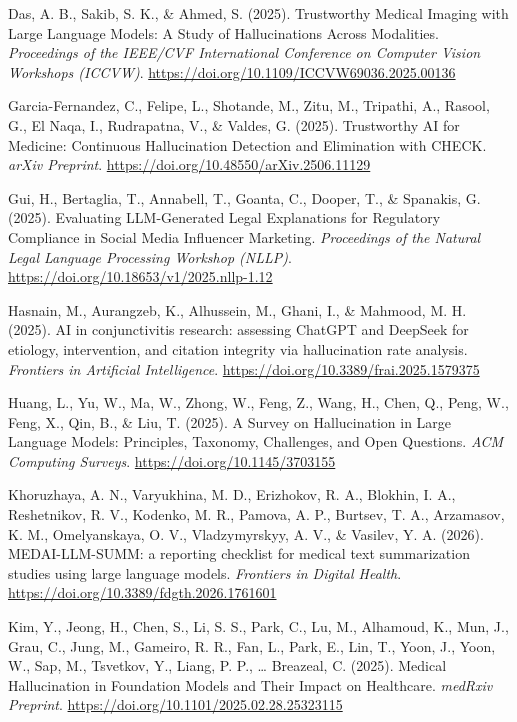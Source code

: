 \documentclass[
  11pt,
  a4paper,
]{article}
\newlength{\cslhangindent}
\newenvironment{CSLReferences}[2] %
 {\begin{list}{}{%
  \setlength{\itemindent}{0pt}
  \setlength{\leftmargin}{0pt}
  \setlength{\parsep}{0pt}
  \ifodd #1
   \setlength{\leftmargin}{\cslhangindent}
   \setlength{\itemindent}{-1\cslhangindent}
  \fi
  \setlength{\itemsep}{#2\baselineskip}}}
 {\end{list}}
\begin{document}
\begin{CSLReferences}{1}{0}
Das, A. B., Sakib, S. K., \& Ahmed, S. (2025). {Trustworthy Medical
Imaging with Large Language Models: A Study of Hallucinations Across
Modalities}. \emph{Proceedings of the IEEE/CVF International Conference
on Computer Vision Workshops (ICCVW)}.
\url{https://doi.org/10.1109/ICCVW69036.2025.00136}

Garcia-Fernandez, C., Felipe, L., Shotande, M., Zitu, M., Tripathi, A.,
Rasool, G., El Naqa, I., Rudrapatna, V., \& Valdes, G. (2025).
{Trustworthy AI for Medicine: Continuous Hallucination Detection and
Elimination with CHECK}. \emph{arXiv Preprint}.
\url{https://doi.org/10.48550/arXiv.2506.11129}

Gui, H., Bertaglia, T., Annabell, T., Goanta, C., Dooper, T., \&
Spanakis, G. (2025). {Evaluating LLM-Generated Legal Explanations for
Regulatory Compliance in Social Media Influencer Marketing}.
\emph{Proceedings of the Natural Legal Language Processing Workshop
(NLLP)}. \url{https://doi.org/10.18653/v1/2025.nllp-1.12}

Hasnain, M., Aurangzeb, K., Alhussein, M., Ghani, I., \& Mahmood, M. H.
(2025). {AI in conjunctivitis research: assessing ChatGPT and DeepSeek
for etiology, intervention, and citation integrity via hallucination
rate analysis}. \emph{Frontiers in Artificial Intelligence}.
\url{https://doi.org/10.3389/frai.2025.1579375}

Huang, L., Yu, W., Ma, W., Zhong, W., Feng, Z., Wang, H., Chen, Q.,
Peng, W., Feng, X., Qin, B., \& Liu, T. (2025). {A Survey on
Hallucination in Large Language Models: Principles, Taxonomy,
Challenges, and Open Questions}. \emph{ACM Computing Surveys}.
\url{https://doi.org/10.1145/3703155}

Khoruzhaya, A. N., Varyukhina, M. D., Erizhokov, R. A., Blokhin, I. A.,
Reshetnikov, R. V., Kodenko, M. R., Pamova, A. P., Burtsev, T. A.,
Arzamasov, K. M., Omelyanskaya, O. V., Vladzymyrskyy, A. V., \& Vasilev,
Y. A. (2026). {MEDAI-LLM-SUMM: a reporting checklist for medical text
summarization studies using large language models}. \emph{Frontiers in
Digital Health}. \url{https://doi.org/10.3389/fdgth.2026.1761601}

Kim, Y., Jeong, H., Chen, S., Li, S. S., Park, C., Lu, M., Alhamoud, K.,
Mun, J., Grau, C., Jung, M., Gameiro, R. R., Fan, L., Park, E., Lin, T.,
Yoon, J., Yoon, W., Sap, M., Tsvetkov, Y., Liang, P. P., \ldots{}
Breazeal, C. (2025). {Medical Hallucination in Foundation Models and
Their Impact on Healthcare}. \emph{medRxiv Preprint}.
\url{https://doi.org/10.1101/2025.02.28.25323115}


\end{CSLReferences}
\end{document}

